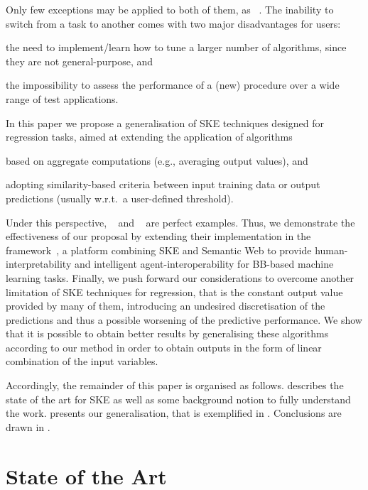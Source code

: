 \documentclass[
]{ceurart}
\begin{document}
%
Only few exceptions may be applied to both of them, as \cart{}~\cite{breiman1984classification}.
%
The inability to switch from a task to another comes with two major disadvantages for users:
%
\begin{inlinelist}
	\item the need to implement/learn how to tune a larger number of algorithms, since they are not general-purpose, and
	\item the impossibility to assess the performance of a (new) procedure over a wide range of test applications.
\end{inlinelist}

In this paper we propose a generalisation of SKE techniques designed for regression tasks, aimed at extending the application of algorithms
%
\begin{inlinelist}
	\item based on aggregate computations (e.g., averaging output values), and
	\item adopting similarity-based criteria between input training data or output predictions (usually w.r.t.\ a user-defined threshold).
\end{inlinelist}
%
Under this perspective, \iter{}~\cite{huysmans2006iter} and \gridex{}~\cite{gridex-extraamas2021} are perfect examples.
%
Thus, we demonstrate the effectiveness of our proposal by extending their implementation in the \psyke{} framework~\cite{psyke-woa2021,psyke-ia2022,psyke-extraamas2022}, a platform combining SKE and Semantic Web to provide human-interpretability and intelligent agent-interoperability for BB-based machine learning tasks.
%
Finally, we push forward our considerations to overcome another limitation of SKE techniques for regression, that is the constant output value provided by many of them, introducing an undesired discretisation of the predictions and thus a possible worsening of the predictive performance.
%
We show that it is possible to obtain better results by generalising these algorithms according to our method in order to obtain outputs in the form of linear combination of the input variables.

Accordingly, the remainder of this paper is organised as follows.
%
 describes the state of the art for SKE as well as some background notion to fully understand the work.
%
 presents our generalisation, that is exemplified in .
%
Conclusions are drawn in .

\section{State of the Art}\label{sec:state}
\end{document}
